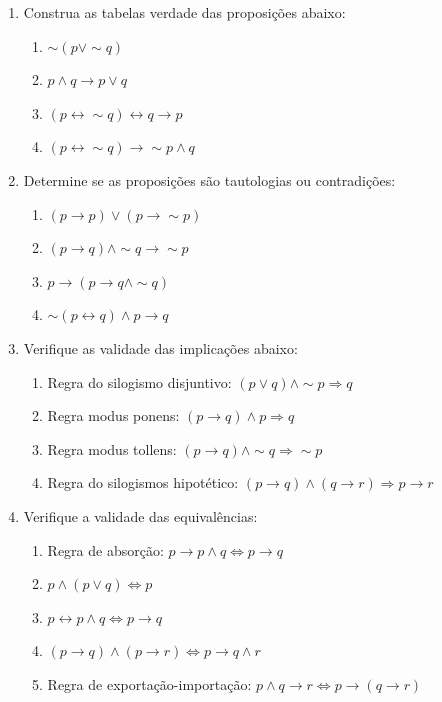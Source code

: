 \documentclass[a4paper,5pt]{amsbook}
\newcommand{\ra}{\rightarrow}
\newcommand{\lra}{\leftrightarrow}
\newcommand{\Ra}{\Rightarrow}
\newcommand{\LRa}{\Leftrightarrow}
\renewcommand{\lnot}{\sim}
\begin{document}
\vspace{1cm}
\begin{enumerate}
    \vspace{0.5cm}
    \item Construa as tabelas verdade das proposi\c{c}\~oes abaixo:
        \begin{enumerate}
            \item $\lnot(p\lor \lnot q)$
            \item $p\land q \ra p\lor q$
            \item $(p\lra \lnot q)\lra q \ra p$
            \item $(p\lra \lnot q) \ra \lnot p \land q$
        \end{enumerate}

    \vspace{0.5cm}
    \item Determine se as proposi\c{c}\~oes s\~ao tautologias ou contradi\c{c}\~oes:
        \begin{enumerate}
            \item $(p\ra p) \lor (p\ra \lnot p)$
            \item $(p\ra q) \land \lnot q \ra \lnot p$
            \item $p\ra (p\ra q \land \lnot q)$
            \item $\lnot(p \lra q) \land p \ra q$
        \end{enumerate}

    \vspace{0.5cm}
    \item Verifique as validade das implica\c{c}\~oes abaixo:
        \begin{enumerate}
            \item Regra do silogismo disjuntivo: $(p\lor q)\land \lnot p \Ra q$
            \item Regra modus ponens: $(p\ra q)\land p \Ra q$
            \item Regra modus tollens: $(p\ra q) \land \lnot q \Ra \lnot p$
            \item Regra do silogismos hipot\'etico: $(p\ra q)\land(q\ra r)\Ra p\ra r$
        \end{enumerate}

    \vspace{0.5cm}
    \item Verifique a validade das equival\^encias:
        \begin{enumerate}
            \item Regra de absor\c{c}\~ao: $p\ra p\land q \LRa p\ra q$
            \item $p\land(p\lor q)\LRa p$
            \item $p\lra p\land q \LRa p\ra q$
            \item $(p\ra q)\land(p\ra r)\LRa p\ra q\land r$
            \item Regra de exporta\c{c}\~ao-importa\c{c}\~ao: $p\land q \ra r\LRa p\ra(q\ra r)$
        \end{enumerate}


\end{enumerate}
\end{document}
